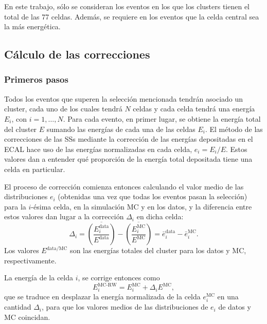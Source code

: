 En este trabajo, sólo se consideran los eventos en los que los clusters tienen el total de las 77 celdas. Además, se requiere en los eventos que la celda central sea la más energética.






\subsection{C\'alculo de las correcciones}
\label{subsec:ss_corrections:cell_rw:calculation}

\subsubsection{Primeros pasos}
\label{subsubsec:ss_corrections:cell_rw:calculation:previous}

Todos los eventos que superen la selección mencionada tendrán asociado un cluster, cada uno de los cuales tendrá \(N\) celdas y cada celda tendrá una energía \(E_i\), con \(i=1,\dots,N\). Para cada evento, en primer lugar, se obtiene la energía total del cluster \(E\) sumando las energ\'ias de cada una de las celdas \(E_i\).
El m\'etodo de las correcciones de las \acp{SS} mediante la correcci\'on de las energ\'ias depositadas en el \ac{ECAL} hace uso de las energ\'ias normalizadas en cada celda, \(e_i = E_i/E\). Estos valores dan a entender qu\'e proporci\'on de la energ\'ia total depositada tiene una celda en particular.

El proceso de correcci\'on comienza entonces calculando el valor medio de las distribuciones \(e_i\) (obtenidas una vez que todas los eventos pasan la selecci\'on) para la \(i\)-\'esima celda, en la simulaci\'on \ac{MC} y en los datos, y la diferencia entre estos valores dan lugar a la correcci\'on \(\Delta_i\) en dicha celda:
\begin{equation}
    \label{eq:ss_corrections:cell_rw:calculation:previous:old_corrections}
    \Delta_i = \overline{\left( \frac{ E_i^{\text{data}} }{ E^{\text{data}} } \right)} - \overline{\left( \frac{ E_i^{\text{MC}} }{ E^{\text{MC}} } \right)}
    = \bar e_i^{\text{data}} - \bar e_i^{\text{MC}}.
\end{equation}
Los valores \(E^{\text{data/MC}}\) son las energías totales del cluster para los datos y \ac{MC}, respectivamente.

La energ\'ia de la celda \(i\), se corrige entonces como
\begin{equation}
    \label{eq:ss_corrections:cell_rw:calculation:previous:correction_method}
    E_i^{\text{MC-RW}} = E_i^{\text{MC}} + \Delta_i E^{\text{MC}},
\end{equation}
que se traduce en desplazar la energía normalizada de la celda \(e_i^{\text{MC}}\) en una cantidad \(\Delta_i\), para que los valores medios de las distribuciones de \(e_i\) de datos y \ac{MC} coincidan. 

